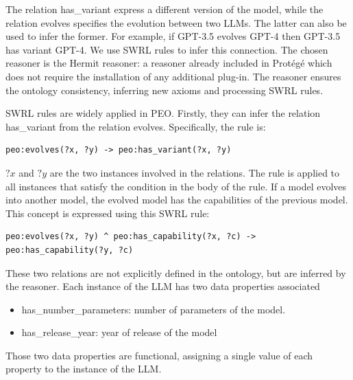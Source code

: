 The relation has\_variant express a different version of the model, while the relation evolves specifies the evolution between two LLMs. 
The latter can also be used to infer the former.
For example, if GPT-3.5 evolves GPT-4 then GPT-3.5 has variant GPT-4.
We use SWRL rules to infer this connection. 
The chosen reasoner is the Hermit reasoner\cite{glimm2014hermit}: a reasoner already included in Protégé which does not require the installation of any additional plug-in.
The reasoner ensures the ontology consistency, inferring new axioms and processing SWRL rules.

SWRL rules are widely applied in PEO.
Firstly, they can infer the relation has\_variant from the relation  evolves. Specifically, the rule is:
\begin{lstlisting}
peo:evolves(?x, ?y) -> peo:has_variant(?x, ?y)
\end{lstlisting}
$?x$ and $?y$ are the two instances involved in the relations.
The rule is applied to all instances that satisfy the condition in the body of the rule.
If a model evolves into another model, the evolved model has the capabilities of the previous model.
This concept is expressed using this SWRL rule:
\begin{lstlisting}
peo:evolves(?x, ?y) ^ peo:has_capability(?x, ?c) -> peo:has_capability(?y, ?c)
\end{lstlisting}
These two relations are not explicitly defined in the ontology, but are inferred by the reasoner.
Each instance of the LLM has two data properties associated 
\begin{itemize}
    \item has\_number\_parameters: number of parameters of the model.

    \item has\_release\_year: year of release of the model
\end{itemize}
Those two data properties are functional, assigning a single value of each property to the instance of the LLM.

